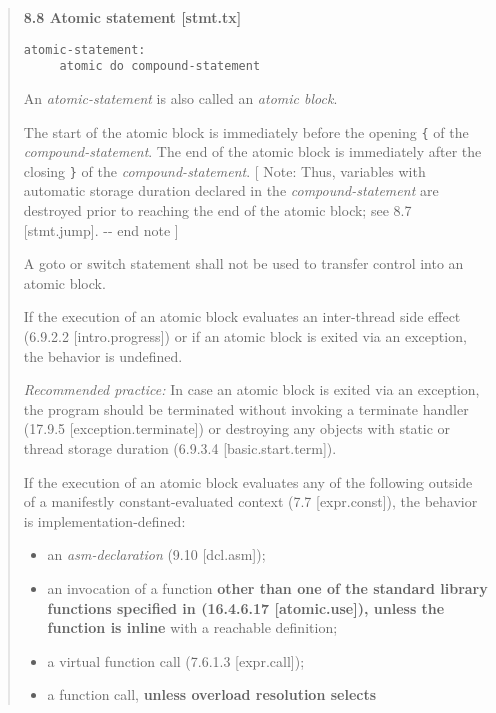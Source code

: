 \begin{quote}
\textbf{8.8 Atomic statement {[}stmt.tx{]}}

\begin{verbatim}
atomic-statement:
     atomic do compound-statement
\end{verbatim}

An \emph{atomic-statement} is also called an \emph{atomic block}.

The start of the atomic block is immediately before the opening
\texttt{\{} of the \emph{compound-statement}. The end of the atomic
block is immediately after the closing \texttt{\}} of the
\emph{compound-statement}. {[} Note: Thus, variables with automatic
storage duration declared in the \emph{compound-statement} are destroyed
prior to reaching the end of the atomic block; see 8.7 {[}stmt.jump{]}.
-\/- end note {]}

A goto or switch statement shall not be used to transfer control into an
atomic block.

If the execution of an atomic block evaluates an inter-thread side
effect (6.9.2.2 {[}intro.progress{]}) or if an atomic block is exited
via an exception, the behavior is undefined.

\emph{Recommended practice:} In case an atomic block is exited via an
exception, the program should be terminated without invoking a terminate
handler (17.9.5 {[}exception.terminate{]}) or destroying any objects
with static or thread storage duration (6.9.3.4 {[}basic.start.term{]}).

If the execution of an atomic block evaluates any of the following
outside of a manifestly constant-evaluated context (7.7
{[}expr.const{]}), the behavior is implementation-defined:

\begin{itemize}
\tightlist
\item
  an \emph{asm-declaration} (9.10 {[}dcl.asm{]});
\item
  an invocation of a function \textbf{other than one of the standard
  library functions specified in (16.4.6.17 {[}atomic.use{]}), unless
  the function is inline} with a reachable definition;
\item
  a virtual function call (7.6.1.3 {[}expr.call{]});
\item
  a function call, \textbf{unless overload resolution selects}


\end{itemize}
\end{quote}

